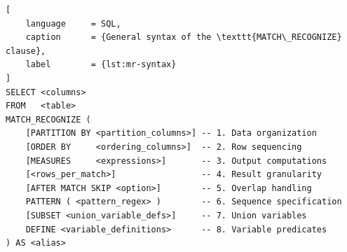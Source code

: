 \begin{lstlisting}[
    language     = SQL,
    caption      = {General syntax of the \texttt{MATCH\_RECOGNIZE} clause},
    label        = {lst:mr-syntax}
]
SELECT <columns>
FROM   <table>
MATCH_RECOGNIZE (
    [PARTITION BY <partition_columns>] -- 1. Data organization
    [ORDER BY     <ordering_columns>]  -- 2. Row sequencing
    [MEASURES     <expressions>]       -- 3. Output computations
    [<rows_per_match>]                 -- 4. Result granularity
    [AFTER MATCH SKIP <option>]        -- 5. Overlap handling
    PATTERN ( <pattern_regex> )        -- 6. Sequence specification
    [SUBSET <union_variable_defs>]     -- 7. Union variables
    DEFINE <variable_definitions>      -- 8. Variable predicates
) AS <alias>
\end{lstlisting}

